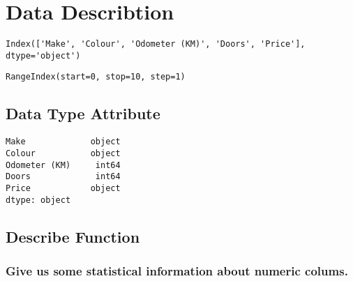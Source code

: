 \documentclass[11pt]{article}
\begin{document}
    \hypertarget{data-describtion}{%
\section{\texorpdfstring{\textbf{Data
Describtion}}{Data Describtion}}\label{data-describtion}}

            \begin{tcolorbox}[breakable, size=fbox, boxrule=.5pt, pad at break*=1mm, opacityfill=0]
\begin{Verbatim}[commandchars=\\\{\}]
Index(['Make', 'Colour', 'Odometer (KM)', 'Doors', 'Price'], dtype='object')
\end{Verbatim}
\end{tcolorbox}
        
            \begin{tcolorbox}[breakable, size=fbox, boxrule=.5pt, pad at break*=1mm, opacityfill=0]
\begin{Verbatim}[commandchars=\\\{\}]
RangeIndex(start=0, stop=10, step=1)
\end{Verbatim}
\end{tcolorbox}
        
    \hypertarget{data-type-attribute}{%
\subsection{\texorpdfstring{\textbf{Data Type
Attribute}}{Data Type Attribute}}\label{data-type-attribute}}

            \begin{tcolorbox}[breakable, size=fbox, boxrule=.5pt, pad at break*=1mm, opacityfill=0]
\begin{Verbatim}[commandchars=\\\{\}]
Make             object
Colour           object
Odometer (KM)     int64
Doors             int64
Price            object
dtype: object
\end{Verbatim}
\end{tcolorbox}
        
    \hypertarget{describe-function}{%
\subsection{\texorpdfstring{\textbf{Describe
Function}}{Describe Function}}\label{describe-function}}

\hypertarget{give-us-some-statistical-information-about-numeric-colums.}{%
\subsubsection{\texorpdfstring{\textbf{Give us some statistical
information about numeric
colums.}}{Give us some statistical information about numeric colums.}}\label{give-us-some-statistical-information-about-numeric-colums.}}
\end{document}
